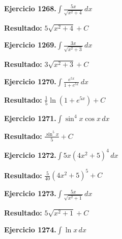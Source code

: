\documentclass[10pt,a4paper]{article}
\begin{document}
\begin{ejbox}
\textbf{Ejercicio 1268.}\quad $\int \frac{5x}{\sqrt{x^2+4}}\,dx$
\end{ejbox}

\begin{solbox}
\textbf{Resultado:} \(\displaystyle 5\sqrt{x^2+4} + C\)
\end{solbox}

\begin{ejbox}
\textbf{Ejercicio 1269.}\quad $\int \frac{3x}{\sqrt{x^2+3}}\,dx$
\end{ejbox}

\begin{solbox}
\textbf{Resultado:} \(\displaystyle 3\sqrt{x^2+3} + C\)
\end{solbox}

\newpage
\begin{ejbox}
\textbf{Ejercicio 1270.}\quad $\int \frac{e^{5x}}{1+e^{5x}}\,dx$
\end{ejbox}

\begin{solbox}
\textbf{Resultado:} \(\displaystyle \frac{1}{5}\ln(1+e^{5x}) + C\)
\end{solbox}

\begin{ejbox}
\textbf{Ejercicio 1271.}\quad $\int \sin^{4}x \cos x\,dx$
\end{ejbox}

\begin{solbox}
\textbf{Resultado:} \(\displaystyle \frac{\sin^{5}x}{5} + C\)
\end{solbox}

\begin{ejbox}
\textbf{Ejercicio 1272.}\quad $\int 5x(4x^2 + 5)^{4}\,dx$
\end{ejbox}

\begin{solbox}
\textbf{Resultado:} \(\displaystyle \frac{5}{40}(4x^2+5)^{5} + C\)
\end{solbox}

\newpage
\begin{ejbox}
\textbf{Ejercicio 1273.}\quad $\int \frac{5x}{\sqrt{x^2+1}}\,dx$
\end{ejbox}

\begin{solbox}
\textbf{Resultado:} \(\displaystyle 5\sqrt{x^2+1} + C\)
\end{solbox}

\begin{ejbox}
\textbf{Ejercicio 1274.}\quad $\int \ln x\,dx$
\end{ejbox}
\end{document}
